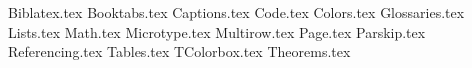 {Biblatex.tex}
{Booktabs.tex}
{Captions.tex}
{Code.tex}
{Colors.tex}
{Glossaries.tex}
{Lists.tex}
{Math.tex}
{Microtype.tex}
{Multirow.tex}
{Page.tex}
{Parskip.tex}
{Referencing.tex}
{Tables.tex}
{TColorbox.tex}
{Theorems.tex}
\usepackage[english]{babel}
\usepackage{algorithm}
\usepackage{algpseudocode}
\usepackage{blindtext}
\usepackage{csquotes}
\usepackage{datetime2}
\usepackage{expl3}
\usepackage{float}
\usepackage{fontspec}
\usepackage{graphicx}
\usepackage{kbordermatrix}
\usepackage{keyval}
\usepackage{url}
\usepackage{xparse}
